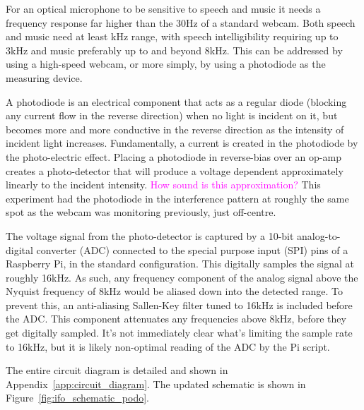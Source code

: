 \documentclass[prb,preprint]{revtex4-1}
\newcommand{\jam}{\textcolor{magenta}}
\begin{document}
For an optical microphone to be sensitive to speech and music it needs a frequency response far higher than the 30Hz of a standard webcam. Both speech and music need at least kHz range, with speech intelligibility requiring up to 3kHz and music preferably up to and beyond 8kHz. This can be addressed by using a high-speed webcam, or more simply, by using a photodiode as the measuring device.


A photodiode is an electrical component that acts as a regular diode (blocking any current flow in the reverse direction) when no light is incident on it, but becomes more and more conductive in the reverse direction as the intensity of incident light increases. 
Fundamentally, a current is created in the photodiode by the photo-electric effect. Placing a photodiode in reverse-bias over an op-amp creates a photo-detector that will produce a voltage dependent approximately linearly to the incident intensity. \jam{How sound is this approximation?} This experiment had the photodiode in the interference pattern at roughly the same spot as the webcam was monitoring previously, just off-centre.


The voltage signal from the photo-detector is captured by a 10-bit analog-to-digital converter (ADC) connected to the special purpose input (SPI) pins of a Raspberry Pi, in the standard configuration. This digitally samples the signal at roughly 16kHz. As such, any frequency component of the analog signal above the Nyquist frequency of 8kHz would be aliased down into the detected range.
To prevent this, an anti-aliasing Sallen-Key filter tuned to 16kHz is included before the ADC. This component attenuates any frequencies above 8kHz, before they get digitally sampled.
It’s not immediately clear what’s limiting the sample rate to 16kHz, but it is likely non-optimal reading of the ADC by the Pi script.


The entire circuit diagram is detailed and shown in Appendix~\ref{app:circuit_diagram}. The updated schematic is shown in Figure~\ref{fig:ifo_schematic_podo}.
\end{document}
